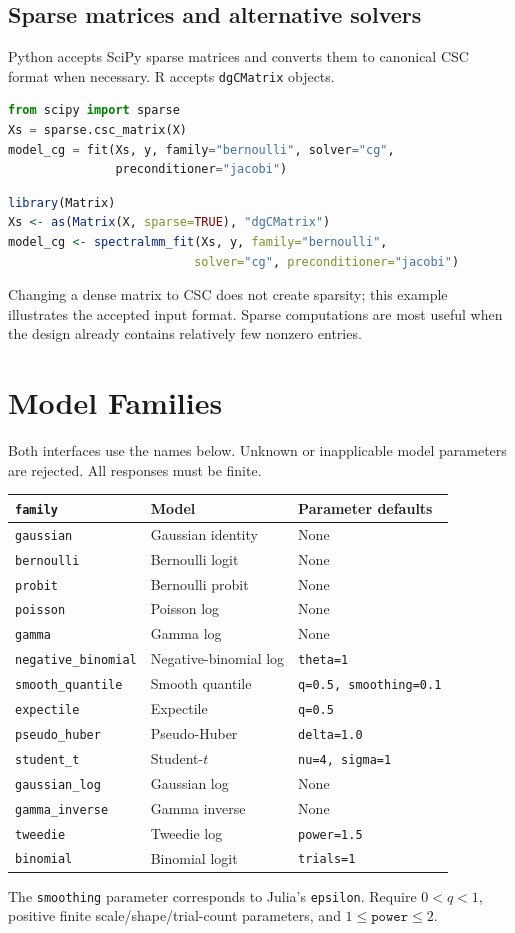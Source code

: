 \documentclass[11pt,a4paper]{article}
\newcommand{\code}[1]{\texttt{#1}}
\begin{document}
\subsection{Sparse matrices and alternative solvers}
Python accepts SciPy sparse matrices and converts them to canonical CSC format
when necessary. R accepts \code{dgCMatrix} objects.
\begin{lstlisting}[language=Python]
from scipy import sparse
Xs = sparse.csc_matrix(X)
model_cg = fit(Xs, y, family="bernoulli", solver="cg",
               preconditioner="jacobi")
\end{lstlisting}
\begin{lstlisting}[language=R]
library(Matrix)
Xs <- as(Matrix(X, sparse=TRUE), "dgCMatrix")
model_cg <- spectralmm_fit(Xs, y, family="bernoulli",
                          solver="cg", preconditioner="jacobi")
\end{lstlisting}
Changing a dense matrix to CSC does not create sparsity; this example illustrates
the accepted input format. Sparse computations are most useful when the design
already contains relatively few nonzero entries.

\section{Model Families}
Both interfaces use the names below. Unknown or inapplicable model parameters
are rejected. All responses must be finite.
\begin{center}
\small
\begin{tabular}{lll}
\toprule
\code{family} & Model & Parameter defaults \\
\midrule
\code{gaussian} & Gaussian identity & None \\
\code{bernoulli} & Bernoulli logit & None \\
\code{probit} & Bernoulli probit & None \\
\code{poisson} & Poisson log & None \\
\code{gamma} & Gamma log & None \\
\code{negative\_binomial} & Negative-binomial log & \code{theta=1} \\
\code{smooth\_quantile} & Smooth quantile & \code{q=0.5, smoothing=0.1} \\
\code{expectile} & Expectile & \code{q=0.5} \\
\code{pseudo\_huber} & Pseudo-Huber & \code{delta=1.0} \\
\code{student\_t} & Student-$t$ & \code{nu=4, sigma=1} \\
\code{gaussian\_log} & Gaussian log & None \\
\code{gamma\_inverse} & Gamma inverse & None \\
\code{tweedie} & Tweedie log & \code{power=1.5} \\
\code{binomial} & Binomial logit & \code{trials=1} \\
\bottomrule
\end{tabular}
\end{center}
The \code{smoothing} parameter corresponds to Julia's \code{epsilon}.
Require $0<q<1$, positive finite scale/shape/trial-count parameters, and
$1\leq\code{power}\leq2$.
\end{document}
